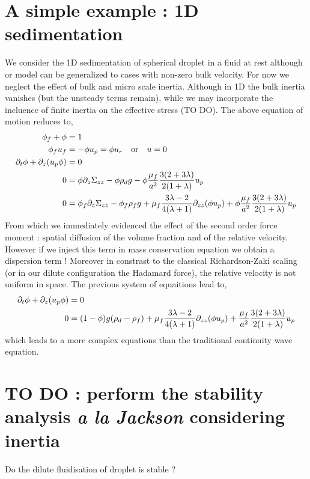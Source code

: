 \section{A simple example : 1D sedimentation}
We consider the 1D sedimentation of spherical droplet in a fluid at rest although or model can be generalized to cases with non-zero bulk velocity.
For now we neglect the effect of bulk and micro scale inertia. 
Although in 1D the bulk inertia vanishes (but the unsteady terms remain), while we may incorporate the incluence of finite inertia on the effective stress (TO DO).
The above equation of motion reduces to,
\begin{align}
    \phi _f + \phi &= 1\\
    \phi _f u_f &= -\phi u_p  = \phi u_r\quad \text{or} \quad  u = 0 \\
\partial_t \phi +\partial _z(u_p\phi)&=0  \\
0&= \phi \partial _z \Sigma _{zz}
- \phi \rho _d g
- \phi\frac{\mu_f}{a^2}
\frac{3(2+3\lambda)}{2(1+\lambda)}u_p\\
0    &= \phi_f\partial _z \Sigma _{zz}
- \phi_f\rho_f  g
+ \mu_f \frac{3\lambda - 2}{4(\lambda+1)} \partial _{zz}(\phi u_p)
+ \phi\frac{\mu_f}{a^2}
\frac{3(2+3\lambda)}{2(1+\lambda)}u_p
\end{align}
From which we immediately evidenced the effect of the second order force moment : spatial diffusion of the volume fraction and of the relative velocity.
However if we inject this term in mass conservation equation we obtain a dispersion term !
Moreover in constrast to the classical Richardson-Zaki  scaling (or in our dilute configuration the Hadamard force), the relative velocity is not uniform in space.
The previous system of equaitions lead to,
\begin{align}
\partial_t \phi +\partial _z(u_p\phi)&=0  \\
0    &= 
 (1-\phi)g (\rho _d -\rho_f)
+ \mu_f \frac{3\lambda - 2}{4(\lambda+1)} \partial _{zz}(\phi u_p)
+ \frac{\mu_f}{a^2}
\frac{3(2+3\lambda)}{2(1+\lambda)}u_p
\end{align}
which leads to a more complex equations than the traditional continuity wave equation.



\section{TO DO : perform the stability analysis \textit{a la Jackson} considering inertia}
Do the dilute fluidisation of droplet is stable ?